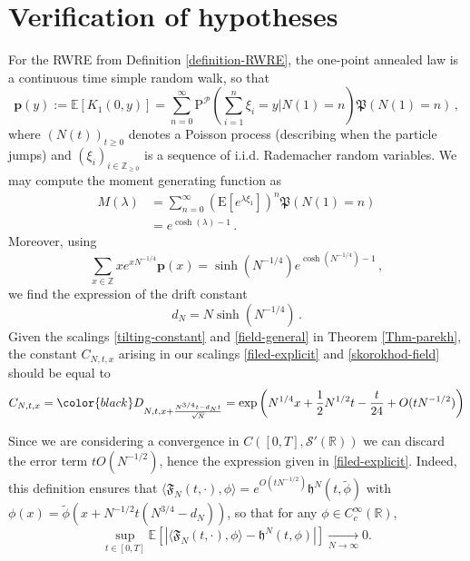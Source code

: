 \documentclass[a4paper,11pt,oneside,reqno]{amsart}
\theoremstyle{definition}
\newcommand{\R}{\ensuremath{\mathbb{R}}}
\renewcommand{\geq}{\geqslant}
\numberwithin{equation}{section}
\begin{document}
\section{Verification of hypotheses}\label{section-assumptions}
For the RWRE from Definition \ref{definition-RWRE}, the one-point annealed law is a continuous time simple random walk, so that 
\begin{equation}\label{mu}
	\mathbf p(y):=\mathbb{E}\left[K_{1}(0,y)\right]=\sum_{n=0}^{\infty}\mathrm{P}^{\mathcal{P}}\left(\sum_{i=1}^{n}\xi_{i}=y\bigg| N(1)=n\right)\mathfrak{P}(N(1)=n)\,,
\end{equation}
where $(N(t))_{t\geq 0}$ denotes a Poisson process (describing when the particle jumps) and  $(\xi_{i})_{i\in \mathbb{Z}_{\geq 0}}$ is a sequence of i.i.d. Rademacher random variables. We may compute the moment generating function as
\begin{align}
		M(\lambda) 
		&=\sum_{n=0}^{\infty}\left(\mathrm{E}\left[e^{\lambda\xi_{1}}\right]\right)^{n}\mathfrak{P}\left(N(1)=n\right) \nonumber\\
		&=e^{\cosh(\lambda)-1}\,. \label{moment-generating-function}
\end{align}
Moreover, using 
\begin{equation*}
		\sum_{x\in\mathbb{Z}}x e^{x N^{-1/4}}\mathbf p(x)=
		\sinh(N^{-1/4})e^{\cosh(N^{-1/4})-1}\,,
\end{equation*}
we find the expression of the drift constant
	\begin{equation}\label{drift-explicit}
		d_{N}=N\sinh(N^{-1/4})\,.
\end{equation}
Given the scalings \eqref{tilting-constant} and \eqref{field-general} in Theorem \ref{Thm-parekh},  the {\color{black}constant} $C_{N,t,x}$ arising in our scalings  \eqref{filed-explicit} and \eqref{skorokhod-field} should be equal to
\begin{equation*}
	{C_{N,t,x} = \color{black}D_{N, t,x+ \frac{ N^{3/4}t - d_N t}{\sqrt{N}}}= \exp{\left(N^{1/4}x+\frac{1}{2}N^{1/2}t-\frac{t}{24}+O(tN^{-1/2})\right)}}
\end{equation*}

{\color{black}Since we are considering a convergence in $C([0,T],\mathcal{S}'(\R))$ we can discard the error term $t O(N^{-1/2})$, hence the expression given in \eqref{filed-explicit}.  Indeed, this definition ensures that $ \langle \mathfrak F_N(t, \cdot), \phi\rangle  = e^{O(tN^{-1/2})}  \mathfrak h^N(t,\widetilde \phi)$ with $ \phi(x)=\widetilde \phi(x+ N^{-1/2}t(N^{3/4}-d_N))$, so that for any $\phi\in C_c^{\infty}(\R)$, 
	$$ \sup_{t\in [0,T]}\mathbb E\left[ \left\vert\langle \mathfrak F_N(t, \cdot), \phi\rangle-\mathfrak h^N(t, \phi) \right\vert\right] \xrightarrow[N\to\infty]{}0.$$}
\end{document}
